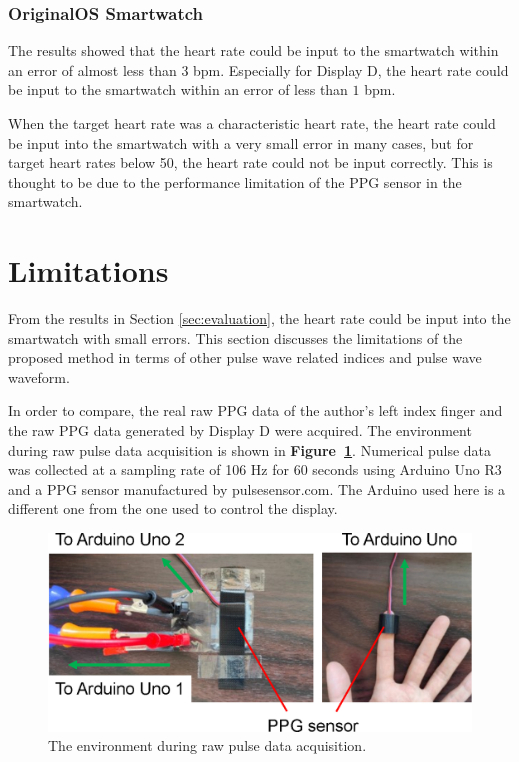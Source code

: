 \documentclass[sigchi,authordraft]{acmart}
\newcommand\figref[1]{\textbf{Figure~\ref{fig:#1}}}
\begin{document}
\subsubsection{OriginalOS Smartwatch}
The results showed that the heart rate could be input to the smartwatch within an error of almost less than $3$ bpm. Especially for Display D, the heart rate could be input to the smartwatch within an error of less than $1$ bpm.\par

When the target heart rate was a characteristic heart rate, the heart rate could be input into the smartwatch with a very small error in many cases, but for target heart rates below 50, the heart rate could not be input correctly. This is thought to be due to the performance limitation of the PPG sensor in the smartwatch.



\section{Limitations}
\label{sec:limitation}
From the results in Section \ref{sec:evaluation}, the heart rate could be input into the smartwatch with small errors. This section discusses the limitations of the proposed method in terms of other pulse wave related indices and pulse wave waveform.\par

In order to compare, the real raw PPG data of the author's left index finger and the raw PPG data generated by Display D were acquired. The environment during raw pulse data acquisition is shown in \figref{raw_data_acquisition}. Numerical pulse data was collected at a sampling rate of 106 Hz for 60 seconds using Arduino Uno R3 and a PPG sensor manufactured by pulsesensor.com. The Arduino used here is a different one from the one used to control the display.

\begin{figure}[!t]
  \centering
  \includegraphics[width=1\linewidth]{figures/raw_data_acquisition.eps}
  \caption{The environment during raw pulse data acquisition.}
  \label{fig:raw_data_acquisition}
\end{figure}
\end{document}
